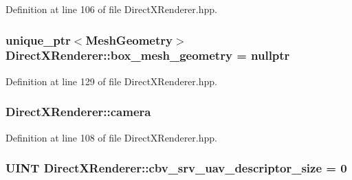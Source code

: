 Definition at line 106 of file Direct\+X\+Renderer.\+hpp.

\subsubsection[{\texorpdfstring{box\+\_\+mesh\+\_\+geometry}{box_mesh_geometry}}]{\setlength{\rightskip}{0pt plus 5cm}unique\+\_\+ptr$<${\bf Mesh\+Geometry}$>$ Direct\+X\+Renderer\+::box\+\_\+mesh\+\_\+geometry = nullptr\hspace{0.3cm}{\ttfamily [protected]}}\hypertarget{class_direct_x_renderer_a834f2538756929aa9744cee706dae4e9_a834f2538756929aa9744cee706dae4e9}{}\label{class_direct_x_renderer_a834f2538756929aa9744cee706dae4e9_a834f2538756929aa9744cee706dae4e9}


Definition at line 129 of file Direct\+X\+Renderer.\+hpp.

\subsubsection[{\texorpdfstring{camera}{camera}}]{ Direct\+X\+Renderer\+::camera\hspace{0.3cm}{\ttfamily [protected]}}\hypertarget{class_direct_x_renderer_aa951dfb1fd582826829d938eaffef28d_aa951dfb1fd582826829d938eaffef28d}{}\label{class_direct_x_renderer_aa951dfb1fd582826829d938eaffef28d_aa951dfb1fd582826829d938eaffef28d}


Definition at line 108 of file Direct\+X\+Renderer.\+hpp.

\subsubsection[{\texorpdfstring{cbv\+\_\+srv\+\_\+uav\+\_\+descriptor\+\_\+size}{cbv_srv_uav_descriptor_size}}]{\setlength{\rightskip}{0pt plus 5cm}U\+I\+NT Direct\+X\+Renderer\+::cbv\+\_\+srv\+\_\+uav\+\_\+descriptor\+\_\+size = 0\hspace{0.3cm}{\ttfamily [protected]}}\hypertarget{class_direct_x_renderer_ad2737cb5c487cbec53f3cd4ce74ff386_ad2737cb5c487cbec53f3cd4ce74ff386}{}\label{class_direct_x_renderer_ad2737cb5c487cbec53f3cd4ce74ff386_ad2737cb5c487cbec53f3cd4ce74ff386}


